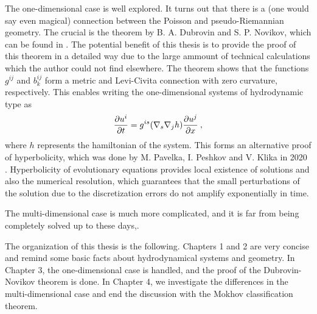 The one-dimensional case is well explored. It turns out that there is a (one would say even magical) connection between the Poisson and pseudo-Riemannian geometry. The crucial is the theorem by B. A. Dubrovin and S. P. Novikov, which can be found in \cite{Dubrovin-Novikov}. The potential benefit of this thesis is to provide the proof of this theorem in a detailed way due to the large ammount of technical calculations which the author could not find elsewhere. The theorem shows that the functions $g^{ij}$ and $b^{ij}_k$ form a metric and Levi-Civita connection with zero curvature, respectively. This enables writing the one-dimensional systems of hydrodynamic type as
\begin{align}
    \frac{\partial u^i}{\partial t} = g ^{i s} (\nabla_s \nabla_j h ) \frac{\partial u^j}{\partial x} \:,
\end{align}
where $h$ represents the hamiltonian of the system. This forms an alternative proof of hyperbolicity, which was done by M. Pavelka, I. Peshkov and V. Klika in 2020 \cite{Pavelka}. Hyperbolicity of evolutionary equations provides local existence of solutions and also the numerical resolution, which guarantees that the small perturbations of the solution due to the discretization errors do not amplify exponentially in time.

The multi-dimensional case is much more complicated, and it is far from being completely solved up to these days,.

The organization of this thesis is the following. Chapters 1 and 2 are very concise and remind some basic facts about hydrodynamical systems and geometry. In Chapter 3, the one-dimensional case is handled, and the proof of the Dubrovin-Novikov theorem is done. In Chapter 4, we investigate the differences in the multi-dimensional case and end the discussion with the Mokhov classification theorem.


